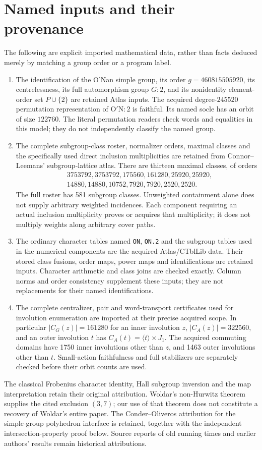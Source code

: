 \documentclass[11pt,a4paper]{article}
\newcommand{\ON}{\mathrm{O'N}}
\newcommand{\gen}[1]{\langle #1\rangle}
\begin{document}
\section{Named inputs and their provenance}\label{sec:inputs}
The following are explicit imported mathematical data, rather than facts
deduced merely by matching a group order or a program label.
\begin{enumerate}
\item The identification of the O'Nan simple group, its order
$g=460815505920$, its centrelessness, its full automorphism group $G:2$,
and its nonidentity element-order set $P\cup\{2\}$ are retained Atlas
inputs. The acquired degree-$245520$ permutation representation of
$\ON:2$ is faithful. Its named socle has an orbit of size $122760$.
The literal permutation readers check words and equalities in this model;
they do not independently classify the named group.
\item The complete subgroup-class roster, normalizer orders, maximal
classes and the specifically used direct inclusion multiplicities are
retained from Connor--Leemans' subgroup-lattice atlas. There are thirteen
maximal classes, of orders
\[
\begin{split}
&3753792,3753792,175560,161280,25920,25920,\\[-2pt]
&14880,14880,10752,7920,7920,2520,2520.
\end{split}
\]
The full roster has 581 subgroup classes. Unweighted containment alone
does not supply arbitrary weighted incidences. Each component requiring
an actual inclusion multiplicity proves or acquires that multiplicity;
it does not multiply weights along arbitrary cover paths.
\item The ordinary character tables named \texttt{ON}, \texttt{ON.2}
and the subgroup tables used in the numerical components are the acquired
Atlas/CTblLib data. Their stored class fusions, order maps, power maps and
identifications are retained inputs. Character arithmetic and class joins
are checked exactly. Column norms and order consistency supplement these
inputs; they are not replacements for their named identifications.
\item The complete centralizer, pair and word-transport certificates
used for involution enumeration are imported at their precise acquired
scope. In particular $|C_G(z)|=161280$ for an inner involution $z$,
$|C_A(z)|=322560$, and an outer involution $t$ has
$C_A(t)=\gen t\times J_1$. The acquired commuting domains have 1750
inner involutions other than $z$, and 1463 outer involutions other than
$t$. Small-action faithfulness and full stabilizers are separately
checked before their orbit counts are used.
\end{enumerate}
The classical Frobenius character identity, Hall subgroup inversion and
the map interpretation retain their original attribution. Woldar's
non-Hurwitz theorem supplies the cited exclusion $(3,7)$; our use of that
theorem does not constitute a recovery of Woldar's entire paper. The
Conder--Oliveros attribution for the simple-group polyhedron interface
is retained, together with the independent intersection-property proof
below. Source reports of old running times and earlier authors' results
remain historical attributions.
\end{document}
